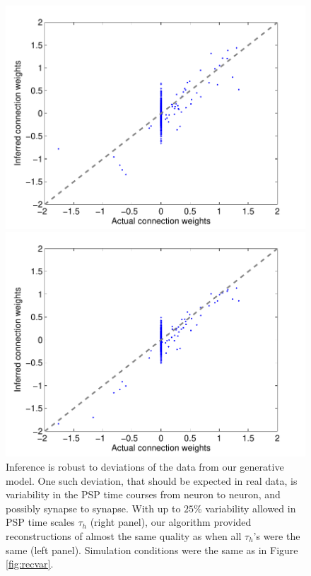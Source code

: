 \begin{figure}[h]
\centering
\begin{minipage}[c]{0.45\hsize}
\includegraphics[width=\hsize]{../figs/FigureA9_all_same_sol}
\end{minipage}
\begin{minipage}[c]{0.45\hsize}
\includegraphics[width=\hsize]{../figs/FigureA9_variable_25}
\end{minipage}
\caption{
Inference is robust to deviations of the data from our generative model. One such deviation, that should be expected in real data, is variability in the PSP time courses from neuron to neuron, and possibly synapse to synapse. With up to $25\%$ variability allowed in PSP time scales $\tau_h$ (right panel), our algorithm provided reconstructions of almost the same quality as when all $\tau_h$'s were the same (left panel). Simulation conditions were the same as in Figure \ref{fig:recvar}.}
\label{fig:vartau}
\end{figure}

